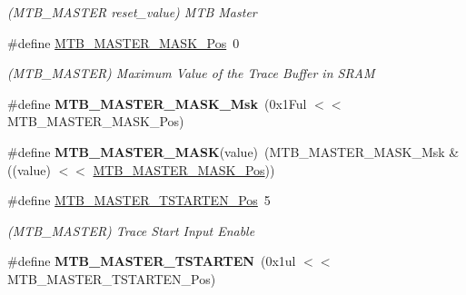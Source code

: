 \begin{DoxyCompactItemize}
\begin{DoxyCompactList}\small\item\em (M\+T\+B\+\_\+\+M\+A\+S\+T\+E\+R reset\+\_\+value) M\+T\+B Master \end{DoxyCompactList}\item 
\hypertarget{group___s_a_m_l21___m_t_b_gabbdb10176810b7faca2550878c30e445}{}\#define \hyperlink{group___s_a_m_l21___m_t_b_gabbdb10176810b7faca2550878c30e445}{M\+T\+B\+\_\+\+M\+A\+S\+T\+E\+R\+\_\+\+M\+A\+S\+K\+\_\+\+Pos}~0\label{group___s_a_m_l21___m_t_b_gabbdb10176810b7faca2550878c30e445}

\begin{DoxyCompactList}\small\item\em (M\+T\+B\+\_\+\+M\+A\+S\+T\+E\+R) Maximum Value of the Trace Buffer in S\+R\+A\+M \end{DoxyCompactList}\item 
\hypertarget{group___s_a_m_l21___m_t_b_gaa7536d183a155d43ff29a4758f03c990}{}\#define {\bfseries M\+T\+B\+\_\+\+M\+A\+S\+T\+E\+R\+\_\+\+M\+A\+S\+K\+\_\+\+Msk}~(0x1\+Ful $<$$<$ M\+T\+B\+\_\+\+M\+A\+S\+T\+E\+R\+\_\+\+M\+A\+S\+K\+\_\+\+Pos)\label{group___s_a_m_l21___m_t_b_gaa7536d183a155d43ff29a4758f03c990}

\item 
\hypertarget{group___s_a_m_l21___m_t_b_gabefa741208d170818ff7e0ecab803440}{}\#define {\bfseries M\+T\+B\+\_\+\+M\+A\+S\+T\+E\+R\+\_\+\+M\+A\+S\+K}(value)~(M\+T\+B\+\_\+\+M\+A\+S\+T\+E\+R\+\_\+\+M\+A\+S\+K\+\_\+\+Msk \& ((value) $<$$<$ \hyperlink{group___s_a_m_l21___m_t_b_gabbdb10176810b7faca2550878c30e445}{M\+T\+B\+\_\+\+M\+A\+S\+T\+E\+R\+\_\+\+M\+A\+S\+K\+\_\+\+Pos}))\label{group___s_a_m_l21___m_t_b_gabefa741208d170818ff7e0ecab803440}

\item 
\hypertarget{group___s_a_m_l21___m_t_b_ga3f03df82dc77e5930c3898c92e666900}{}\#define \hyperlink{group___s_a_m_l21___m_t_b_ga3f03df82dc77e5930c3898c92e666900}{M\+T\+B\+\_\+\+M\+A\+S\+T\+E\+R\+\_\+\+T\+S\+T\+A\+R\+T\+E\+N\+\_\+\+Pos}~5\label{group___s_a_m_l21___m_t_b_ga3f03df82dc77e5930c3898c92e666900}

\begin{DoxyCompactList}\small\item\em (M\+T\+B\+\_\+\+M\+A\+S\+T\+E\+R) Trace Start Input Enable \end{DoxyCompactList}\item 
\hypertarget{group___s_a_m_l21___m_t_b_ga5e6ecc0b0af324a43225a11681a7d31e}{}\#define {\bfseries M\+T\+B\+\_\+\+M\+A\+S\+T\+E\+R\+\_\+\+T\+S\+T\+A\+R\+T\+E\+N}~(0x1ul $<$$<$ M\+T\+B\+\_\+\+M\+A\+S\+T\+E\+R\+\_\+\+T\+S\+T\+A\+R\+T\+E\+N\+\_\+\+Pos)\label{group___s_a_m_l21___m_t_b_ga5e6ecc0b0af324a43225a11681a7d31e}


\end{DoxyCompactItemize}
